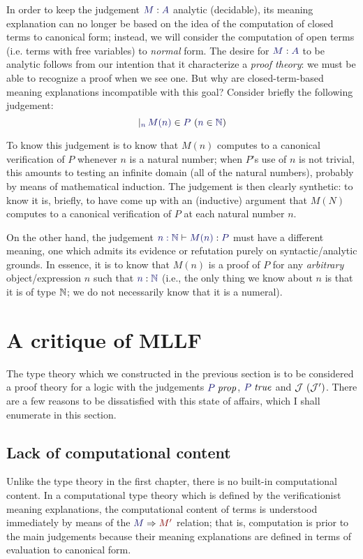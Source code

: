 \documentclass[main.tex]{subfiles}
\begin{document}
In order to keep the judgement $\ofty{M}{A}$ analytic (decidable), its meaning
explanation can no longer be based on the idea of the computation of closed
terms to canonical form; instead, we will consider the computation of open
terms (i.e. terms with free variables) to \emph{normal} form. The desire for
$\ofty{M}{A}$ to be analytic follows from our intention that it characterize a
\emph{proof theory}: we must be able to recognize a proof when we see one. But
why are closed-term-based meaning explanations incompatible with this goal?
Consider briefly the following judgement:
\[
  \genj{n}{\hyp{\ver{M(n)}{P}}{\ver{n}{\naturals}}}
\]

To know this judgement is to know that $M(n)$ computes to a canonical
verification of $P$ whenever $n$ is a natural number; when $P$'s use of $n$ is
not trivial, this amounts to testing an infinite domain (all of the natural
numbers), probably by means of mathematical induction. The judgement is then
clearly synthetic: to know it is, briefly, to have come up with an (inductive)
argument that $M(N)$ computes to a canonical verification of $P$ at each
natural number $n$.

On the other hand, the judgement $\lfsequent{n:\naturals}{\ofty{M(n)}{P}}$ must have a
different meaning, one which admits its evidence or refutation purely on
syntactic/analytic grounds. In essence, it is to know that $M(n)$ is a proof of
$P$ for any \emph{arbitrary} object/expression $n$ such that $\ofty{n}{\naturals}$
(i.e., the only thing we know about $n$ is that it is of type $\mathbb{N}$; we
do not necessarily know that it is a numeral).


\section{A critique of \textbf{MLLF}}

The type theory which we constructed in the previous section is to be
considered a proof theory for a logic with the judgements
$\isprop{P}$, $\istrue{P}$ and
$\mathcal{J}\ (\mathcal{J}')$. There are a few reasons to be
dissatisfied with this state of affairs, which I shall enumerate in
this section.

\subsection{Lack of computational content}

Unlike the type theory in the first chapter, there is no built-in computational
content. In a computational type theory which is defined by the verificationist
meaning explanations, the computational content of terms is understood
immediately by means of the $\reduce{M}{M'}$ relation; that is, computation is
prior to the main judgements because their meaning explanations are defined in
terms of evaluation to canonical form.
\end{document}

